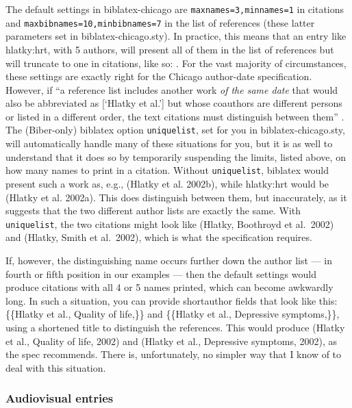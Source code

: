 \documentclass[a4paper,12pt]{report}
\begin{document}
The default settings in \textsf{biblatex-chicago} are
\texttt{maxnames=3,minnames=1} in citations and
\texttt{max\-bibnames=10,minbibnames=7} in the list of references
(these latter parameters set in \textsf{biblatex-chicago.sty}).  In
practice, this means that an entry like hlatky:hrt, with 5 authors,
will present all of them in the list of references but will truncate
to one in citations, like so: \autocite{hlatky:hrt}.  For the vast
majority of circumstances, these settings are exactly right for the
Chicago author-date specification.  However, if \enquote{a reference
  list includes another work \emph{of the same date} that would also
  be abbreviated as [\enquote{Hlatky et al.}] but whose coauthors are
  different persons or listed in a different order, the text citations
  must distinguish between them} \autocite[15.28]{chicago:manual}.
The (\textsf{Biber}-only) \textsf{biblatex} option
\texttt{uniquelist}, set for you in \textsf{biblatex-chicago.sty},
will automatically handle many of these situations for you, but it is
as well to understand that it does so by temporarily suspending the
limits, listed above, on how many names to print in a citation.
Without \texttt{uniquelist}, \textsf{biblatex} would present such a
work as, e.g., (Hlatky et al. 2002b), while hlatky:hrt would be
(Hlatky et al. 2002a).  This does distinguish between them, but
inaccurately, as it suggests that the two different author lists are
exactly the same.  With \texttt{uniquelist}, the two citations might
look like (Hlatky, Boothroyd et al.\ 2002) and (Hlatky, Smith et al.\
2002), which is what the specification requires.

If, however, the distinguishing name occurs further down the author
list --- in fourth or fifth position in our examples --- then the
default settings would produce citations with all 4 or 5 names
printed, which can become awkwardly long.  In such a situation, you
can provide \textsf{shortauthor} fields that look like this:
\{\{Hlatky et al., Quality of life,\}\} and \{\{Hlatky et al.,
Depressive symptoms,\}\}, using a shortened title to distinguish the
references.  This would produce (Hlatky et al., Quality of life, 2002)
and (Hlatky et al., Depressive symptoms, 2002), as the spec
recommends.  There is, unfortunately, no simpler way that I know of to
deal with this situation.

\subsubsection*{Audiovisual entries}
\label{sec:audiovisual}
\end{document}
